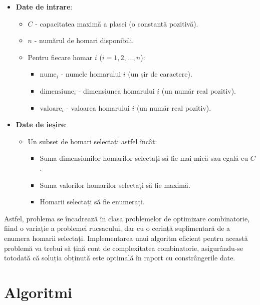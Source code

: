 \documentclass[a4paper,12pt]{article}
\begin{document}
\begin{itemize}
    \item \textbf{Date de intrare}:
    \begin{itemize}
        \item \( C \) - capacitatea maximă a plasei (o constantă pozitivă).
        \item \( n \) - numărul de homari disponibili.
        \item Pentru fiecare homar \( i \) (\( i = 1, 2, \ldots, n \)):
        \begin{itemize}
            \item \( \text{nume}_i \) - numele homarului \( i \) (un șir de caractere).
            \item \( \text{dimensiune}_i \) - dimensiunea homarului \( i \) (un număr real pozitiv).
            \item \( \text{valoare}_i \) - valoarea homarului \( i \) (un număr real pozitiv).
        \end{itemize}
    \end{itemize}
    \item \textbf{Date de ieșire}:
    \begin{itemize}
        \item Un subset de homari selectați astfel încât:
        \begin{itemize}
            \item Suma dimensiunilor homarilor selectați să fie mai mică sau egală cu \( C \).
            \item Suma valorilor homarilor selectați să fie maximă.
            \item Homarii selectați să fie enumerați.
        \end{itemize}
    \end{itemize}
\end{itemize}

Astfel, problema se încadrează în clasa problemelor de optimizare combinatorie, fiind o variație a problemei rucsacului, dar cu o cerință suplimentară de a enumera homarii selectați. Implementarea unui algoritm eficient pentru această problemă va trebui să țină cont de complexitatea combinatorie, asigurându-se totodată că soluția obținută este optimală în raport cu constrângerile date.


\section{Algoritmi}
\end{document}

